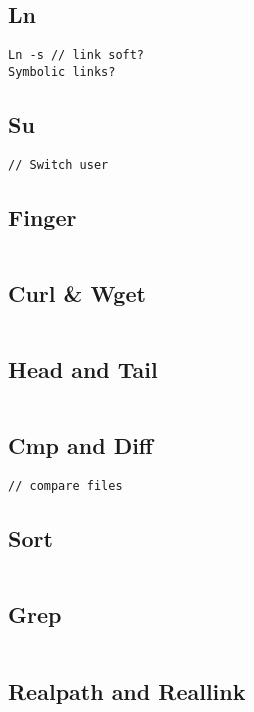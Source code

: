\subsection{Ln}
\begin{verbatim}
Ln -s // link soft?
Symbolic links?
\end{verbatim}
\subsection{Su}
\begin{verbatim}
// Switch user
\end{verbatim}
\subsection{Finger}
\begin{verbatim}
\end{verbatim}

\subsection{Curl & Wget}
\begin{verbatim}
\end{verbatim}

\subsection{Head and Tail}
\begin{verbatim}
\end{verbatim}
\subsection{Cmp and Diff}
\begin{verbatim}
// compare files
\end{verbatim}
\subsection{Sort}
\begin{verbatim}
\end{verbatim}

\subsection{Grep}
\begin{verbatim}
\end{verbatim}

\subsection{Realpath and Reallink}
\begin{verbatim}
\end{verbatim}

